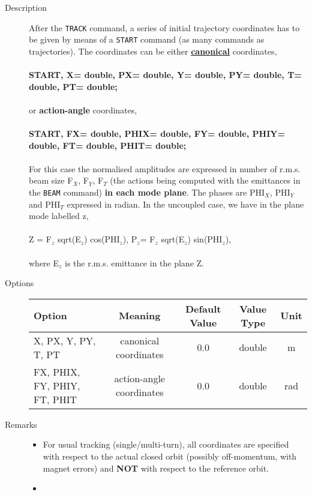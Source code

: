 \begin{description}
	\item[Description] 
            After the \texttt{TRACK} command, a series of initial trajectory coordinates has to be given 
            by means of a \texttt{START} command (as many commands as trajectories). The coordinates can 
            be either \href{../Introduction/tables.html#canon}{\textbf{canonical}} coordinates, 
\\
\\\textbf{START, X= double, PX= double, Y= double, PY= double, T= double, PT= double; }
\\
\\
            or \textbf{action-angle} coordinates,
\\
\\\textbf{START, FX= double, PHIX= double, FY= double, PHIY= double, FT= double, PHIT= double; }
\\
\\
            For this case the normalised amplitudes are expressed in number 
            of r.m.s. beam size F$_X$, F$_Y$, F$_T$ (the actions being computed with the 
            emittances in the \texttt{BEAM}
            command) \textbf{in each mode plane}. The phases are PHI$_X$, PHI$_Y$ and PHI$_T$
            expressed in radian. 
            In the uncoupled case, we have in the plane mode labelled z, 
\\
\\
                    Z = F$_z$ sqrt(E$_z$) cos(PHI$_z$),    
                    P$_z$= F$_z$ sqrt(E$_z$) sin(PHI$_z$), 
\\
\\ 
            where E$_z$ is the r.m.s. emittance in the plane Z.
           
	\item[Options] 
	\text{ \\}
	
\begin{tabular}{p{3cm} cccc}
\hline 
\textbf{Option} & \textbf{Meaning} & \textbf{Default Value} & \textbf{Value Type} & \textbf{Unit} \\ 
\hline
X, PX, Y, PY, T, PT & canonical coordinates & 0.0 & double & m \\ 
\hline
FX, PHIX, FY, PHIY, FT, PHIT & action-angle coordinates & 0.0 & double & rad \\ 
\hline
\end{tabular}

	\item[Remarks] 
\begin{itemize}
	\item 
                For usual tracking (single/multi-turn), all coordinates are specified with respect to the actual closed 
                orbit (possibly off-momentum, with magnet errors) and \textbf{NOT} with respect 
                to the reference orbit.
	\item 


\end{itemize}
\end{description}

